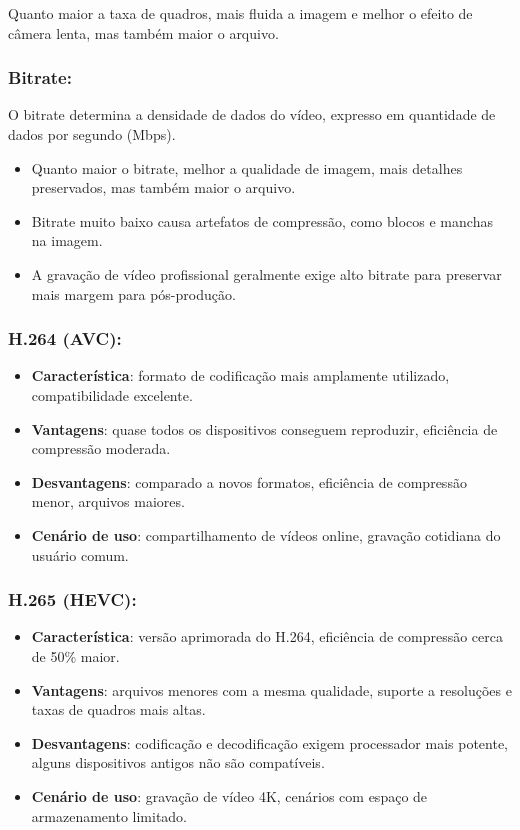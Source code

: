 Quanto maior a taxa de quadros, mais fluida a imagem e melhor o efeito de câmera lenta, mas também maior o arquivo.

\subsubsection*{Bitrate:}

O bitrate determina a densidade de dados do vídeo, expresso em quantidade de dados por segundo (Mbps).

\begin{itemize}
  \item Quanto maior o bitrate, melhor a qualidade de imagem, mais detalhes preservados, mas também maior o arquivo.
  \item Bitrate muito baixo causa artefatos de compressão, como blocos e manchas na imagem.
  \item A gravação de vídeo profissional geralmente exige alto bitrate para preservar mais margem para pós-produção.
\end{itemize}


\subsubsection*{H.264 (AVC):}

\begin{itemize}
  \item \textbf{Característica}: formato de codificação mais amplamente utilizado, compatibilidade excelente.
  \item \textbf{Vantagens}: quase todos os dispositivos conseguem reproduzir, eficiência de compressão moderada.
  \item \textbf{Desvantagens}: comparado a novos formatos, eficiência de compressão menor, arquivos maiores.
  \item \textbf{Cenário de uso}: compartilhamento de vídeos online, gravação cotidiana do usuário comum.
\end{itemize}

\subsubsection*{H.265 (HEVC):}

\begin{itemize}
  \item \textbf{Característica}: versão aprimorada do H.264, eficiência de compressão cerca de 50\% maior.
  \item \textbf{Vantagens}: arquivos menores com a mesma qualidade, suporte a resoluções e taxas de quadros mais altas.
  \item \textbf{Desvantagens}: codificação e decodificação exigem processador mais potente, alguns dispositivos antigos não são compatíveis.
  \item \textbf{Cenário de uso}: gravação de vídeo 4K, cenários com espaço de armazenamento limitado.
\end{itemize}

